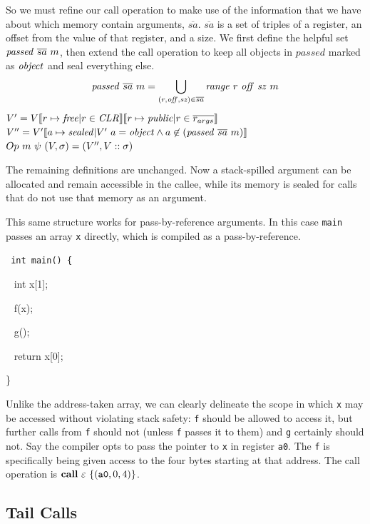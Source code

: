 \documentclass[10pt,conference]{ieeetran}%
\theoremstyle{definition}
\begin{document}
So we must refine our call operation to make use of the information that we have about
which memory contain arguments, \(\overline{sa}\). \(\overline{sa}\) is a set of
triples of a register, an offset from the value of that register, and a size.
We first define the helpful set \(\mathit{passed} ~ \overline{sa} ~ m\),
then extend the call operation to keep all objects in \(\mathit{passed}\) marked
as \(\mathit{object}\) and seal everything else.
%
\[\mathit{passed} ~ \overline{sa} ~ m = \bigcup_{(r,\mathit{off},\mathit{sz}) \in \overline{sa}}
\mathit{range} ~ r ~ \mathit{off} ~ \mathit{sz} ~ m\]
%
             {\(V' = V \llbracket r \mapsto \mathit{free} | r \in \mathit{CLR} \rrbracket
               \llbracket r \mapsto \mathit{public} | r \in \overline{r_{args}} \rrbracket\)}
             {\(V'' = V'\llbracket a \mapsto \mathit{sealed} | V' ~ a = \mathit{object} \land a \not \in (\mathit{passed} ~ \overline{sa} ~ m) \rrbracket\)}
             {\(Op ~ m ~ \psi ~ (V,\sigma) =
               (V'',V::\sigma)\)}

The remaining definitions are unchanged. Now a stack-spilled argument can be allocated
and remain accessible in the callee, while its memory is sealed for calls that do not
use that memory as an argument.

This same structure works for pass-by-reference arguments. In this case {\tt main}
passes an array {\tt x} directly, which is compiled as a pass-by-reference.

{\tt
  int main() \{
  
  ~ int x[1];

  ~ f(x);

  ~ g();

  ~ return x[0];

  \}
}

Unlike the address-taken array, we can clearly delineate the scope in which {\tt x} may be
accessed without violating stack safety: {\tt f} should be allowed to access it, but further
calls from {\tt f} should not (unless {\tt f} passes it to them) and {\tt g} certainly
should not. Say the compiler opts to pass the pointer to {\tt x} in register {\tt a0}.
The {\tt f} is specifically being given access to the four bytes starting at that address.
The call operation is \(\mathbf{call} ~ \varepsilon ~ \{(\mathtt{a0},0,4)\}\).

\subsection{Tail Calls}
\end{document}
